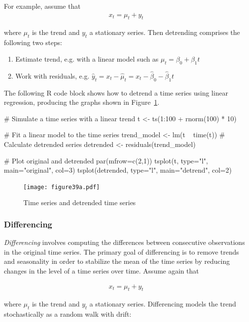 For example, assume that 
\begin{align*}
x_t = \mu_t + y_t
\end{align*}

where $\mu_t$ is the trend and $y_t$ a stationary series. Then detrending comprises the following two steps:

\begin{enumerate}
  \item Estimate trend, e.g. with a linear model such as $\mu_t = \beta_0 + \beta_1 t$
  \item Work with residuals, e.g. $\hat y_t = x_t - \hat \mu_t = x_t - \hat\beta_0 - \hat\beta_1 t$
\end{enumerate}

The following R code block shows how to detrend a time series using linear regression, producing the graphs shown in Figure~\ref{fig:figure39a}.

\begin{Rcode}
# Simulate a time series with a linear trend
t <- ts(1:100 + rnorm(100) * 10)

# Fit a linear model to the time series
trend_model <- lm(t ~ time(t))
# Calculate detrended series
detrended <- residuals(trend_model)

# Plot original and detrended
par(mfrow=c(2,1))
tsplot(t, type="l", main="original", col=3)
tsplot(detrended, type="l", main="detrend", col=2)
\end{Rcode}

\begin{figure}
\centering
\texttt{[image: figure39a.pdf]}
\caption{Time series and detrended time series}
\label{fig:figure39a}
\end{figure}

\subsubsection*{Differencing}

\emph{Differencing} involves computing the differences between consecutive observations in the original time series. The primary goal of differencing is to remove trends and seasonality in order to stabilize the mean of the time series by reducing changes in the level of a time series over time. Assume again that 

\begin{align*}x_t = \mu_t + y_t\end{align*}

\noindent where $\mu_t$ is the trend and $y_t$ a stationary series. Differencing models the trend stochastically as a random walk with drift: 

